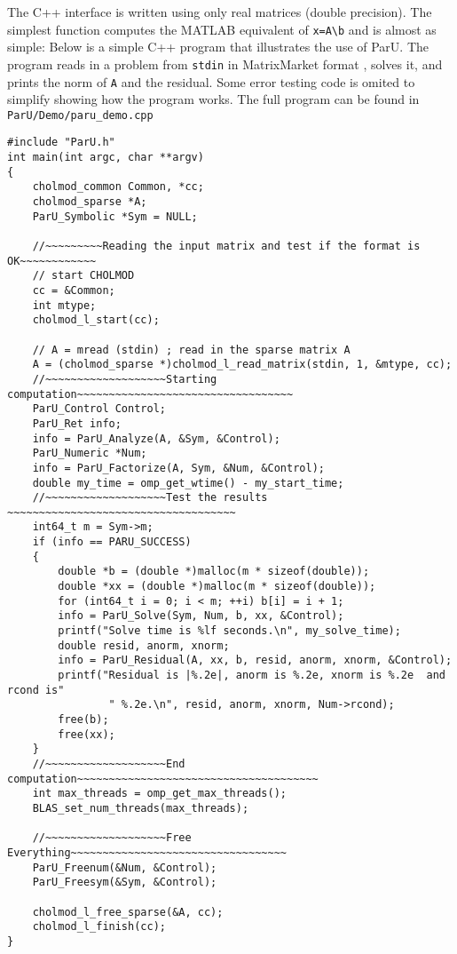 \documentclass[12pt]{article}
\begin{document}
The C++ interface is written using only real matrices (double precision).  
The simplest function computes the MATLAB equivalent of
\verb'x=A\b' and is almost as simple:
Below is a simple C++ program that illustrates the use of ParU.  The
program reads in a problem from \verb'stdin' in MatrixMarket
format \cite{BoisvertPozoRemingtonBarrettDongarra97}, solves it, and prints the
norm of \verb'A' and the residual. 
Some error testing code is omited to simplify showing how the program works. 
The full program can be found in 
\verb'ParU/Demo/paru_demo.cpp'
\begin{verbatim}
#include "ParU.h"
int main(int argc, char **argv)
{
    cholmod_common Common, *cc;
    cholmod_sparse *A;
    ParU_Symbolic *Sym = NULL;

    //~~~~~~~~~Reading the input matrix and test if the format is OK~~~~~~~~~~~~
    // start CHOLMOD
    cc = &Common;
    int mtype;
    cholmod_l_start(cc);

    // A = mread (stdin) ; read in the sparse matrix A
    A = (cholmod_sparse *)cholmod_l_read_matrix(stdin, 1, &mtype, cc);
    //~~~~~~~~~~~~~~~~~~~Starting computation~~~~~~~~~~~~~~~~~~~~~~~~~~~~~~~~~~
    ParU_Control Control;
    ParU_Ret info;
    info = ParU_Analyze(A, &Sym, &Control);
    ParU_Numeric *Num;
    info = ParU_Factorize(A, Sym, &Num, &Control);
    double my_time = omp_get_wtime() - my_start_time;
    //~~~~~~~~~~~~~~~~~~~Test the results ~~~~~~~~~~~~~~~~~~~~~~~~~~~~~~~~~~~~
    int64_t m = Sym->m;
    if (info == PARU_SUCCESS)
    {
        double *b = (double *)malloc(m * sizeof(double));
        double *xx = (double *)malloc(m * sizeof(double));
        for (int64_t i = 0; i < m; ++i) b[i] = i + 1;
        info = ParU_Solve(Sym, Num, b, xx, &Control);
        printf("Solve time is %lf seconds.\n", my_solve_time);
        double resid, anorm, xnorm;
        info = ParU_Residual(A, xx, b, resid, anorm, xnorm, &Control);
        printf("Residual is |%.2e|, anorm is %.2e, xnorm is %.2e  and rcond is"
                " %.2e.\n", resid, anorm, xnorm, Num->rcond);
        free(b);
        free(xx);
    }
    //~~~~~~~~~~~~~~~~~~~End computation~~~~~~~~~~~~~~~~~~~~~~~~~~~~~~~~~~~~~~
    int max_threads = omp_get_max_threads();
    BLAS_set_num_threads(max_threads);

    //~~~~~~~~~~~~~~~~~~~Free Everything~~~~~~~~~~~~~~~~~~~~~~~~~~~~~~~~~~
    ParU_Freenum(&Num, &Control);
    ParU_Freesym(&Sym, &Control);

    cholmod_l_free_sparse(&A, cc);
    cholmod_l_finish(cc);
}
\end{verbatim}
\end{document}
